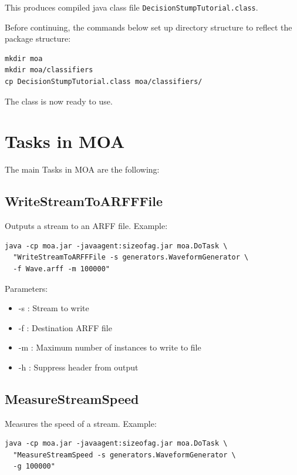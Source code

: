 \documentclass[a4paper,12pt,twoside]{book}
\begin{document}
This produces compiled java class file \verb+DecisionStumpTutorial.class+.

Before continuing, the commands below set up directory structure to reflect the package structure:

\begin{verbatim}
mkdir moa
mkdir moa/classifiers
cp DecisionStumpTutorial.class moa/classifiers/
\end{verbatim}

The class is now ready to use.



\chapter{Tasks in MOA}

The main Tasks in MOA are the following:



\section{WriteStreamToARFFFile} 

Outputs a stream to an ARFF file. 
Example:
\begin{footnotesize}\begin{verbatim}
java -cp moa.jar -javaagent:sizeofag.jar moa.DoTask \
  "WriteStreamToARFFFile -s generators.WaveformGenerator \
  -f Wave.arff -m 100000" 
\end{verbatim}\end{footnotesize}

Parameters:
\begin{itemize}
\item -s : Stream to write
\item -f : Destination ARFF file
\item -m : Maximum number of instances to write to file
\item -h : Suppress header from output\end{itemize}

\section{MeasureStreamSpeed} 
Measures the speed of a stream. Example:

\begin{footnotesize}\begin{verbatim}
java -cp moa.jar -javaagent:sizeofag.jar moa.DoTask \
  "MeasureStreamSpeed -s generators.WaveformGenerator \
  -g 100000" 
\end{verbatim}\end{footnotesize}
\end{document}
